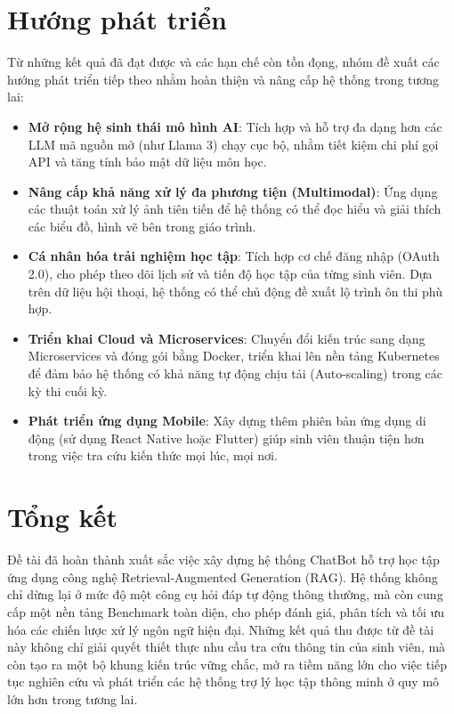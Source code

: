 \section{Hướng phát triển}

Từ những kết quả đã đạt được và các hạn chế còn tồn đọng, nhóm đề xuất các hướng phát triển tiếp theo nhằm hoàn thiện và nâng cấp hệ thống trong tương lai:
\begin{itemize}
	\item \textbf{Mở rộng hệ sinh thái mô hình AI}: Tích hợp và hỗ trợ đa dạng hơn các LLM mã nguồn mở (như Llama 3) chạy cục bộ, nhằm tiết kiệm chi phí gọi API và tăng tính bảo mật dữ liệu môn học.
	\item \textbf{Nâng cấp khả năng xử lý đa phương tiện (Multimodal)}: Ứng dụng các thuật toán xử lý ảnh tiên tiến để hệ thống có thể đọc hiểu và giải thích các biểu đồ, hình vẽ bên trong giáo trình.
	\item \textbf{Cá nhân hóa trải nghiệm học tập}: Tích hợp cơ chế đăng nhập (OAuth 2.0), cho phép theo dõi lịch sử và tiến độ học tập của từng sinh viên. Dựa trên dữ liệu hội thoại, hệ thống có thể chủ động đề xuất lộ trình ôn thi phù hợp.
	\item \textbf{Triển khai Cloud và Microservices}: Chuyển đổi kiến trúc sang dạng Microservices và đóng gói bằng Docker, triển khai lên nền tảng Kubernetes để đảm bảo hệ thống có khả năng tự động chịu tải (Auto-scaling) trong các kỳ thi cuối kỳ.
	\item \textbf{Phát triển ứng dụng Mobile}: Xây dựng thêm phiên bản ứng dụng di động (sử dụng React Native hoặc Flutter) giúp sinh viên thuận tiện hơn trong việc tra cứu kiến thức mọi lúc, mọi nơi.
\end{itemize}

\section{Tổng kết}

Đề tài đã hoàn thành xuất sắc việc xây dựng hệ thống ChatBot hỗ trợ học tập ứng dụng công nghệ Retrieval-Augmented Generation (RAG). Hệ thống không chỉ dừng lại ở mức độ một công cụ hỏi đáp tự động thông thường, mà còn cung cấp một nền tảng Benchmark toàn diện, cho phép đánh giá, phân tích và tối ưu hóa các chiến lược xử lý ngôn ngữ hiện đại. Những kết quả thu được từ đề tài này không chỉ giải quyết thiết thực nhu cầu tra cứu thông tin của sinh viên, mà còn tạo ra một bộ khung kiến trúc vững chắc, mở ra tiềm năng lớn cho việc tiếp tục nghiên cứu và phát triển các hệ thống trợ lý học tập thông minh ở quy mô lớn hơn trong tương lai.